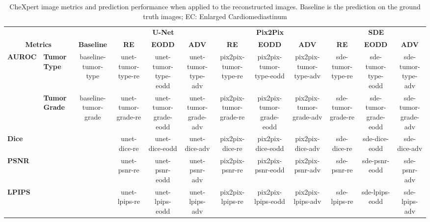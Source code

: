 \begin{table}[]
    \centering
    \caption{CheXpert image metrics and prediction performance when applied to the reconstructed images. Baseline is the prediction on the ground truth images; EC: Enlarged Cardiomediastinum}\label{tab:chex_perf}
    
    \begin{tabular}{ll|cccccccccc}
        \hline
        \multicolumn{2}{c|}{}                                   & \multicolumn{1}{c|}{}                                    & \multicolumn{3}{c|}{\textbf{U-Net}}                             & \multicolumn{3}{c|}{\textbf{Pix2Pix}}                           & \multicolumn{3}{c}{\textbf{SDE}}           \\ \cline{4-12} 
        \multicolumn{2}{c|}{\multirow{-2}{*}{\textbf{Metrics}}} & \multicolumn{1}{c|}{\multirow{-2}{*}{\textbf{Baseline}}} & \textbf{RE} & \textbf{EODD} & \multicolumn{1}{c|}{\textbf{ADV}} & \textbf{RE} & \textbf{EODD} & \multicolumn{1}{c|}{\textbf{ADV}} & \textbf{RE} & \textbf{EODD} & \textbf{ADV} \\ \hline

    \multirow{2}{*}{\textbf{AUROC}} 
    & \textbf{Tumor Type}  & baseline-tumor-type 
        & unet-tumor-type-re & unet-tumor-type-eodd & unet-tumor-type-adv 
        & pix2pix-tumor-type-re & pix2pix-tumor-type-eodd & pix2pix-tumor-type-adv 
        & sde-tumor-type-re & sde-tumor-type-eodd & sde-tumor-type-adv \\
    & \textbf{Tumor Grade} & baseline-tumor-grade 
        & unet-tumor-grade-re & unet-tumor-grade-eodd & unet-tumor-grade-adv 
        & pix2pix-tumor-grade-re & pix2pix-tumor-grade-eodd & pix2pix-tumor-grade-adv 
        & sde-tumor-grade-re & sde-tumor-grade-eodd & sde-tumor-grade-adv \\ \cline{1-2}

    \multicolumn{2}{l|}{\textbf{Dice}} 
        & \cellcolor[HTML]{C0C0C0} 
        & unet-dice-re & unet-dice-eodd & unet-dice-adv 
        & pix2pix-dice-re & pix2pix-dice-eodd & pix2pix-dice-adv 
        & sde-dice-re & sde-dice-eodd & sde-dice-adv \\ \cline{1-2}
    
    \multicolumn{2}{l|}{\textbf{PSNR}} 
        & \cellcolor[HTML]{C0C0C0} 
        & unet-psnr-re & unet-psnr-eodd & unet-psnr-adv 
        & pix2pix-psnr-re & pix2pix-psnr-eodd & pix2pix-psnr-adv 
        & sde-psnr-re & sde-psnr-eodd & sde-psnr-adv \\ \cline{1-2}

    \multicolumn{2}{l|}{\textbf{LPIPS}} 
        & \cellcolor[HTML]{C0C0C0} 
        & unet-lpips-re & unet-lpips-eodd & unet-lpips-adv 
        & pix2pix-lpips-re & pix2pix-lpips-eodd & pix2pix-lpips-adv 
        & sde-lpips-re & sde-lpips-eodd & sde-lpips-adv \\ \hline
\end{tabular}
\end{table}